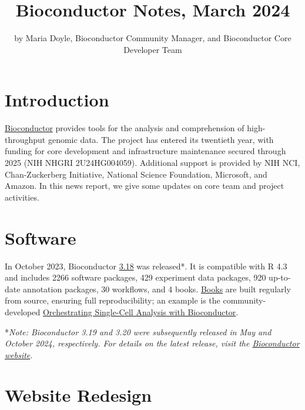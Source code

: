 \title{Bioconductor Notes, March 2024}


\author{by Maria Doyle, Bioconductor Community Manager, and Bioconductor Core Developer Team}

\maketitle


\section{Introduction}\label{introduction}

\href{https://bioconductor.org}{Bioconductor} provides
tools for the analysis and comprehension of high-throughput genomic
data. The project has entered its twentieth year, with funding
for core development and infrastructure maintenance secured
through 2025 (NIH NHGRI 2U24HG004059). Additional support is provided
by NIH NCI, Chan-Zuckerberg Initiative, National Science Foundation,
Microsoft, and Amazon. In this news report, we give some updates on
core team and project activities.

\section{Software}\label{software}

In October 2023, Bioconductor \href{https://bioconductor.org/news/bioc_3_18_release/}{3.18} was released*. It is compatible with R 4.3 and includes 2266 software packages, 429 experiment data packages, 920 up-to-date annotation packages, 30 workflows, and 4 books. \href{https://bioconductor.org/books/release/}{Books} are built regularly from source, ensuring full reproducibility; an example is the community-developed \href{https://bioconductor.org/books/release/OSCA/}{Orchestrating Single-Cell Analysis with Bioconductor}.

*\emph{Note: Bioconductor 3.19 and 3.20 were subsequently released in May and October 2024, respectively. For details on the latest release, visit the \href{https://bioconductor.org/news/}{Bioconductor website}.}

\section{Website Redesign}\label{website-redesign}

